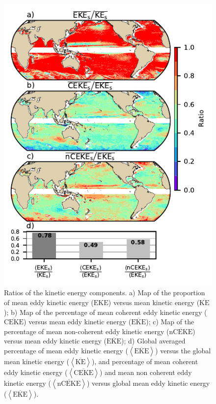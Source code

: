 \documentclass[draft,linenumbers]{agujournal2019}
\newcommand{\MKE}{\overline{\textrm{KE}}}
\newcommand{\MEKE}{\overline{\textrm{EKE}}}
\newcommand{\EKE}{\textrm{EKE}}
\newcommand{\MCEKE}{\overline{\textrm{CEKE}}}
\newcommand{\MnCEKE}{\overline{\textrm{nCEKE}}}
\begin{document}
	\begin{figure}
	    \centering
	    \includegraphics[width=1\textwidth]{figures/eke_ratio_map_easy.pdf}
	    \caption{Ratios of the kinetic energy components. a) Map of the proportion of mean eddy kinetic energy ($\EKE$) versus mean kinetic energy ($\MKE$);
		b) Map of the percentage of mean coherent eddy kinetic energy ($\MCEKE$) versus mean eddy kinetic energy ($\MEKE$);
		c) Map of the percentage of mean non-coherent eddy kinetic energy ($\MnCEKE$) versus mean eddy kinetic energy ($\MEKE$);
		d) Global averaged percentage of mean eddy kinetic energy ($\left<\MEKE\right>$) versus the global mean kinetic energy ($\left<\MKE\right>$), and percentage of mean coherent eddy kinetic energy ($\left<\MCEKE\right>$) and mean non coherent eddy kinetic energy ($\left<\MnCEKE\right>$) versus global mean eddy kinetic energy ($\left<\MEKE\right>$).
		}
	    \label{fig:eddy_ratio}
	\end{figure}
\end{document}
